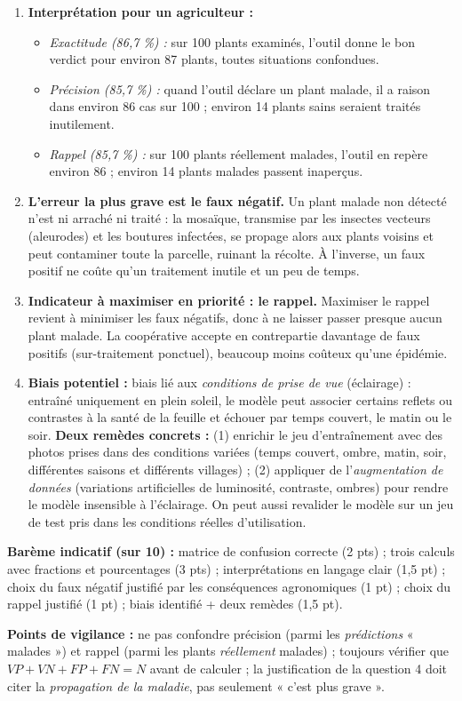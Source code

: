 \documentclass[11pt]{article}
\begin{document}
\begin{corrige}
\begin{enumerate}
\begin{align*}
\end{align*}
\item \textbf{Interprétation pour un agriculteur :}
\begin{itemize}
\item \emph{Exactitude (86,7 \%) :} sur 100 plants examinés, l'outil donne le bon verdict pour environ 87 plants, toutes situations confondues.
\item \emph{Précision (85,7 \%) :} quand l'outil déclare un plant malade, il a raison dans environ 86 cas sur 100 ; environ 14 plants sains seraient traités inutilement.
\item \emph{Rappel (85,7 \%) :} sur 100 plants réellement malades, l'outil en repère environ 86 ; environ 14 plants malades passent inaperçus.
\end{itemize}
\item \textbf{L'erreur la plus grave est le faux négatif.} Un plant malade non détecté n'est ni arraché ni traité : la mosaïque, transmise par les insectes vecteurs (aleurodes) et les boutures infectées, se propage alors aux plants voisins et peut contaminer toute la parcelle, ruinant la récolte. À l'inverse, un faux positif ne coûte qu'un traitement inutile et un peu de temps.
\item \textbf{Indicateur à maximiser en priorité : le rappel.} Maximiser le rappel revient à minimiser les faux négatifs, donc à ne laisser passer presque aucun plant malade. La coopérative accepte en contrepartie davantage de faux positifs (sur-traitement ponctuel), beaucoup moins coûteux qu'une épidémie.
\item \textbf{Biais potentiel :} biais lié aux \emph{conditions de prise de vue} (éclairage) : entraîné uniquement en plein soleil, le modèle peut associer certains reflets ou contrastes à la santé de la feuille et échouer par temps couvert, le matin ou le soir. \textbf{Deux remèdes concrets :} (1) enrichir le jeu d'entraînement avec des photos prises dans des conditions variées (temps couvert, ombre, matin, soir, différentes saisons et différents villages) ; (2) appliquer de l'\emph{augmentation de données} (variations artificielles de luminosité, contraste, ombres) pour rendre le modèle insensible à l'éclairage. On peut aussi revalider le modèle sur un jeu de test pris dans les conditions réelles d'utilisation.
\end{enumerate}

\textbf{Barème indicatif (sur 10) :} matrice de confusion correcte (2 pts) ; trois calculs avec fractions et pourcentages (3 pts) ; interprétations en langage clair (1,5 pt) ; choix du faux négatif justifié par les conséquences agronomiques (1 pt) ; choix du rappel justifié (1 pt) ; biais identifié + deux remèdes (1,5 pt).

\textbf{Points de vigilance :} ne pas confondre précision (parmi les \emph{prédictions} « malades ») et rappel (parmi les plants \emph{réellement} malades) ; toujours vérifier que $VP + VN + FP + FN = N$ avant de calculer ; la justification de la question 4 doit citer la \emph{propagation de la maladie}, pas seulement « c'est plus grave ».
\end{corrige}
\end{document}

